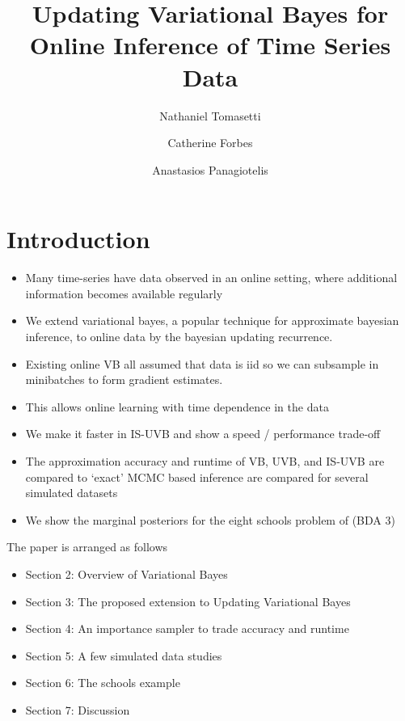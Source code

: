 \documentclass[12pt,a4paper]{article}\usepackage[]{graphicx}\usepackage[]{color}
\title{Updating Variational Bayes for Online Inference of Time Series Data}
\author{Nathaniel Tomasetti 
\and Catherine Forbes
\and Anastasios Panagiotelis}
\begin{document}
\maketitle



\section{Introduction}
\label{sec:intro}

\begin{itemize}
\item Many time-series have data observed in an online setting, where additional information becomes available regularly
\item We extend variational bayes, a popular technique for approximate bayesian inference, to online data by the bayesian updating recurrence.
\item Existing online VB all assumed that data is iid so we can subsample in minibatches to form gradient estimates.
\item This allows online learning with time dependence in the data
\item We make it faster in IS-UVB and show a speed / performance trade-off
\item The approximation accuracy and runtime of VB, UVB, and IS-UVB are compared to `exact' MCMC based inference are compared for several simulated datasets
\item We show the marginal posteriors for the eight schools problem of \cite{Gelman2014} (BDA 3)
\end{itemize}
The paper is arranged as follows
\begin{itemize}
\item Section 2: Overview of Variational Bayes
\item Section 3: The proposed extension to Updating Variational Bayes
\item Section 4: An importance sampler to trade accuracy and runtime
\item Section 5: A few simulated data studies
\item Section 6: The schools example
\item Section 7: Discussion
\end{itemize}
\end{document}

